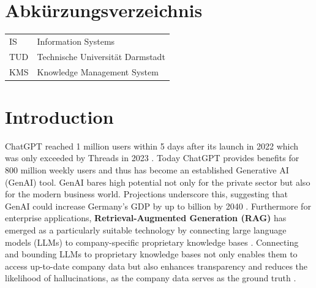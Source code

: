 \documentclass[
	english,
	ruledheaders=section,%
	class=report,%
	thesis={type=bachelor},%
	accentcolor=1b,%
	custommargins=true,%
	marginpar=false,%
	parskip=half-,%
	fontsize=11pt,%
	DIV=14,
]{tudapub}
\begin{document}
\listoftables
{}           %

\chapter*{Abkürzungsverzeichnis}

\begin{xtabular}{ll}
IS					&	Information Systems\\
TUD					&	Technische Universität Darmstadt\\
KMS                 &   Knowledge Management System \\

\end{xtabular} 


\onehalfspacing
\setcounter{seitenzahlroemisch}{\value{page}}

\chapter{Introduction}
ChatGPT reached 1 million users within 5 days after its launch in 2022 which was only exceeded by Threads in 2023 \parencite{Brandt2023}. Today ChatGPT provides benefits for 800 million weekly users \parencite{Huber2025} and thus has become an established Generative AI (GenAI) tool. GenAI bares high potential not only for the private sector but also for the modern business world. Projections underscore this, suggesting that GenAI could increase Germany's GDP by up to  billion by 2040 \parencite[p.~12]{McKinsey2023}. Furthermore for enterprise applications, \textbf{Retrieval-Augmented Generation (RAG)} has emerged as a particularly suitable technology by connecting large language models (LLMs) to company-specific proprietary knowledge bases \parencite[p.~6]{Sahin2024LLM_proceedings}. Connecting and bounding LLMs to proprietary knowledge bases not only enables them to access up-to-date company data but also enhances transparency and reduces the likelihood of hallucinations, as the company data serves as the ground truth \parencite{GoogleCloudRAG}.
\end{document}
